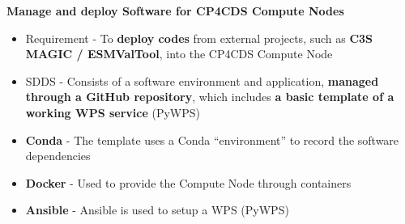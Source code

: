 \documentclass[landscape,a0paper,fontscale=0.4]{baposter} %
\newcommand{\compresslist}{%
\setlength{\itemsep}{1pt}%
\setlength{\parskip}{0pt}%
\setlength{\parsep}{0pt}%
}
\begin{document}
\begin{poster}
{    {\bf Manage and deploy Software for CP4CDS Compute Nodes}
    \begin{itemize}\compresslist
      \item Requirement - To {\bf deploy codes} from external projects,
        such as {\bf C3S MAGIC / ESMValTool}, into the CP4CDS Compute Node
      \item SDDS - Consists of a software environment and application, {\bf managed through a GitHub repository},
        which includes {\bf a basic template of a working WPS service} (PyWPS)
      \item {\bf Conda} -  The template uses a Conda ``environment'' to record the software dependencies
      \item {\bf Docker} - Used to provide the Compute Node through containers
      \item {\bf Ansible} - Ansible is used to setup a WPS (PyWPS) %
    \end{itemize}

}


\end{poster}
\end{document}
